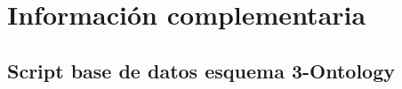 \chapter{Información complementaria}
\label{ape:apeA}

\section{Script base de datos esquema 3-Ontology}

